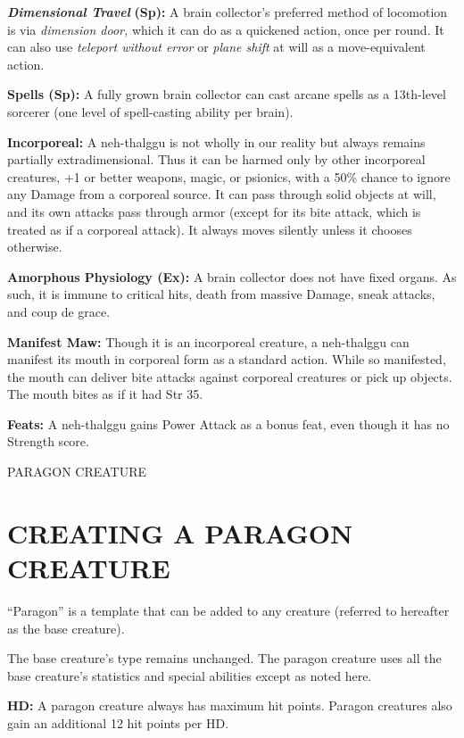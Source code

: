 \documentclass{article}
\begin{document}
{\textit{\textbf{Dimensional Travel }}\textbf{(Sp):} A brain collector's preferred 
method of locomotion is via \textit{dimension door, }which it can do as a quickened 
action, once per round. It can also use \textit{teleport without error }or \textit{plane 
shift }at will as a move-equivalent action.

\textbf{Spells (Sp):} A fully grown brain collector can cast arcane spells as a 
13th-level sorcerer (one level of spell-casting ability per brain).

\textbf{Incorporeal:} A neh-thalggu is not wholly in our reality but always remains 
partially extradimensional. Thus it can be harmed only by other incorporeal creatures, 
+1 or better weapons, magic, or psionics, with a 50\% chance to ignore any Damage 
from a corporeal source. It can pass through solid objects at will, and its own 
attacks pass through armor (except for its bite attack, which is treated as if 
a corporeal attack). It always moves silently unless it chooses otherwise. 

\textbf{Amorphous Physiology (Ex):} A brain collector does not have fixed organs. 
As such, it is immune to critical hits, death from massive Damage, sneak attacks, 
and coup de grace. 

\textbf{Manifest Maw:} Though it is an incorporeal creature, a neh-thalggu can 
manifest its mouth in corporeal form as a standard action. While so manifested, 
the mouth can deliver bite attacks against corporeal creatures or pick up objects. 
The mouth bites as if it had Str 35. 

\textbf{Feats: }A neh-thalggu gains Power Attack as a bonus feat, even though it 
has no Strength score. 

\vspace{12pt}
{\LARGE{}PARAGON CREATURE}

\section*{CREATING A PARAGON CREATURE }

``Paragon'' is a template that can be added to any creature (referred to hereafter 
as the base creature). 

The base creature's type remains unchanged. The paragon creature uses all the base 
creature's statistics and special abilities except as noted here. 

\textbf{HD:} A paragon creature always has maximum hit points. Paragon creatures 
also gain an additional 12 hit points per HD. 

}
\end{document}
